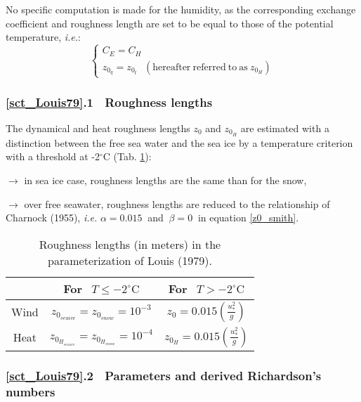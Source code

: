 No specific computation is made for the humidity, as the corresponding exchange coefficient and roughness length are set 
to be equal to those of the potential temperature, \textit{i.e.}:
\begin{equation}
\left\{
\begin{array}{l}
	C_E=C_H\\
	z_{0_q}=z_{0_t}~~~(\mathrm{hereafter}~\mathrm{referred}~\mathrm{to}~\mathrm{as}~z_{0_H})
\end{array}
\right.
\end{equation}

\subsubsection{\ref{sct_Louis79}.1 $~$ Roughness lengths}

The dynamical and heat roughness lengths $z_{0}$ and $z_{0_H}$ are estimated with a distinction between the free sea 
water and the sea ice by a temperature criterion with a threshold at -2$^\circ$C (Tab. \ref{tabzo}):

$\rightarrow$ in sea ice case, roughness lengths are the same than for the snow,

$\rightarrow$ over free seawater, roughness lengths are reduced to the relationship of Charnock (1955), \nocite{Charnock1955} 
		\textit{i.e.} ${\alpha=0.015}~$ and $~\beta=0~$ in equation \ref{z0_smith}.

\begin{table}[!h]
\centering
\begin{tabular}{|c|c|c|}
\hline
		& For $~~T\leq -2^{\circ}\mathrm{C}$ 				  & For $~~T>-2^{\circ}\mathrm{C}$ \\
\hline
	Wind 	& $z_{0_{\mathit{seaice}}}=z_{0_{\mathit{snow}}}=10^{-3}$ 	  & $z_{0}=0.015\left(\frac{u_{*}^{2}}{g}\right)$ \\
\hline
	Heat 	& $z_{0_{H_{\mathit{seaice}}}}=z_{0_{H_{\mathit{snow}}}}=10^{-4}$ & $z_{0_H}=0.015\left(\frac{u_{*}^{2}}{g}\right)$ \\
\hline
\end{tabular}\label{zo}
	\caption{Roughness lengths (in meters) in the parameterization of Louis (1979). %
\label{tabzo}}
\end{table}


\subsubsection{\ref{sct_Louis79}.2 $~$ Parameters and derived Richardson's numbers}

